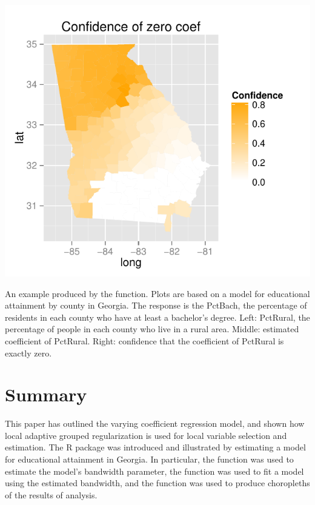 \begin{widefigure}
\begin{adjustbox}{max width=0.9\paperwidth}
\includegraphics{figure/zero.pdf}
\end{adjustbox}
\caption{An example produced by the  function. Plots are based on a model for educational attainment by county in Georgia. The response is the PctBach, the percentage of residents in each county who have at least a bachelor's degree. Left: PctRural, the percentage of people in each county who live in a rural area. Middle: estimated coefficient of PctRural. Right: confidence that the coefficient of PctRural is exactly zero.}
\label{fig:georgia}
\end{widefigure}


\section{Summary}
This paper has outlined the varying coefficient regression model, and shown how local adaptive grouped regularization is used for local variable selection and estimation. The R package  was introduced and illustrated by estimating a model for educational attainment in Georgia. In particular, the  function was used to estimate the model's bandwidth parameter, the  function was used to fit a model using the estimated bandwidth, and the  function was used to produce choropleths of the results of analysis. 





